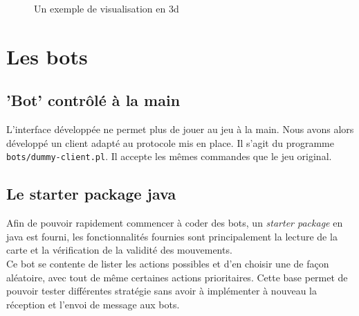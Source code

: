 \documentclass[10pt,a4paper]{report}
\begin{document}
\begin{figure}[H]
  \caption{\label{fig:3d_graph} Un exemple de visualisation en 3d}
\end{figure}

\chapter{Les bots}

\section{'Bot' contrôlé à la main}

L'interface développée ne permet plus de jouer au jeu à la main. Nous avons
alors développé un client adapté au protocole mis en place. Il s'agit du
programme \verb!bots/dummy-client.pl!. Il accepte les mêmes commandes que le jeu
original.

\section{Le starter package java}
Afin de pouvoir rapidement commencer à coder des bots, un \emph{starter package}
en java est fourni, les fonctionnalités fournies sont principalement la lecture
de la carte et la vérification de la validité des mouvements.
\\
Ce bot se contente de lister les actions possibles et d'en choisir une de façon
aléatoire, avec tout de même certaines actions prioritaires. Cette base permet
de pouvoir tester différentes stratégie sans avoir à implémenter à nouveau la
réception et l'envoi de message aux bots.
\end{document}
